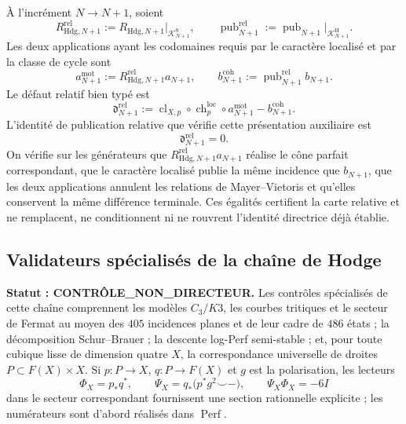 À l'incrément \(N\to N+1\), soient
\[
 R_{\mathrm{Hdg},N+1}^{\mathrm{rel}}
 :=R_{\mathrm{Hdg},N+1}\big|_{\mathscr K^{\mathrm S}_{N+1}},
 \qquad
 \operatorname{pub}_{N+1}^{\mathrm{rel}}
 :=\operatorname{pub}_{N+1}\big|_{\mathscr K^{\mathrm H}_{N+1}}.
\]
Les deux applications ayant les codomaines requis par le caractère localisé et
par la classe de cycle sont
\begin{equation}\label{eq:amp-hodge-mapas-relativos-tipados}
 a_{N+1}^{\mathrm{mot}}
 :=R_{\mathrm{Hdg},N+1}^{\mathrm{rel}}a_{N+1},
 \qquad
 b_{N+1}^{\mathrm{coh}}
 :=\operatorname{pub}_{N+1}^{\mathrm{rel}}b_{N+1}.
\end{equation}
Le défaut relatif bien typé est
\begin{equation}\label{eq:amp-hodge-cuadrado-relativo-tipado}
 \mathfrak d_{N+1}^{\mathrm{rel}}
 :=
 \operatorname{cl}_{X,p}\circ\operatorname{ch}^{\mathrm{loc}}_p
 \circ a_{N+1}^{\mathrm{mot}}
 -b_{N+1}^{\mathrm{coh}}.
\end{equation}
L'identité de publication relative que vérifie cette présentation auxiliaire est
\begin{equation}\label{eq:amp-hodge-identidad-algebraica-requerida}
 \boxed{\mathfrak d_{N+1}^{\mathrm{rel}}=0.}
\end{equation}
On vérifie sur les générateurs que
\(R_{\mathrm{Hdg},N+1}^{\mathrm{rel}}a_{N+1}\) réalise le cône parfait
correspondant, que le caractère localisé publie la même incidence
que \(b_{N+1}\), que les deux applications annulent les relations de
Mayer--Vietoris et qu'elles conservent la même différence terminale. Ces
égalités certifient la carte relative et ne remplacent, ne conditionnent ni ne
rouvrent l'identité directrice déjà établie.

\subsection{Validateurs spécialisés de la chaîne de Hodge}

\noindent\textbf{Statut : CONTRÔLE\_NON\_DIRECTEUR.}
Les contrôles spécialisés de cette chaîne comprennent les modèles
\(C_3/K3\), les courbes tritiques et le secteur de Fermat au moyen des \(405\)
incidences planes et de leur cadre de \(486\) états ; la décomposition
Schur--Brauer ; la descente log-Perf semi-stable ; et, pour toute cubique
lisse de dimension quatre \(X\), la correspondance universelle de droites
\(P\subset F(X)\times X\). Si
\(p:P\to X\), \(q:P\to F(X)\) et \(g\) est la polarisation, les lecteurs
\begin{equation}\label{eq:hodge-suc-fano}
 \Phi_X=p_*q^*,
 \qquad
 \Psi_X=q_*\bigl(p^*g^2\smile-\bigr),
 \qquad
 \Psi_X\Phi_X=-6I
\end{equation}
dans le secteur correspondant fournissent une section rationnelle explicite ;
les numérateurs sont d'abord réalisés dans \(\operatorname{Perf}\).

